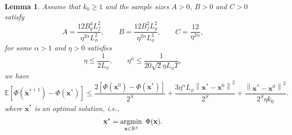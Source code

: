 \documentclass[11pt]{article}
\newtheorem{lemma}[theorem]{Lemma}
\newcommand{\BE}{\mathbb{E}}
\newcommand{\x}{\mathbf x}
\newcommand{\argmin}{\mathop{\rm argmin}}
\newcommand{\br}{\mathbb{R}}
\begin{document}
\begin{lemma}\label{Lemma:Objective-Gap}
Assume that $k_0\geq 1$ and the sample sizes $A>0$, $B>0$ and $C>0$ satisfy 
\begin{equation*}
A = \frac{12 B_g^4 L_f^2}{\eta^{2\alpha}L_\phi^2}, \qquad B = \frac{12 B_f^2 L_g^2}{\eta^{2\alpha}L_\phi^2},  \qquad C = \frac{12}{\eta^{2\alpha}},
\end{equation*}
for some $\alpha>1$ and $\eta>0$ satisfies 
\begin{equation*}
\eta \leq \frac{1}{2 L_\phi}, \qquad \eta^{\alpha} \leq \frac{1}{20\sqrt{2}\eta L_\phi T}, 
\end{equation*}
we have
\begin{equation*}
\BE\left[\Phi(\tilde{\x}^{s+1}) - \Phi(\x^*)\right] \leq \frac{2\left[\Phi(\x^0)-\Phi(\x^*)\right]}{2^S} + \frac{3 \eta^\alpha L_\phi\left\| \x^* - \x^0 \right\|^2}{2^S} + \frac{\left\| \x^* - \x^0 \right\|^2}{2^S\eta k_0}. 
\end{equation*}
where $\x^*$ is an optimal solution, i.e., 
\begin{equation*}
\x^* = \argmin_{\x\in\br^d} \ \Phi(\x). 
\end{equation*}
\end{lemma}
\end{document}
